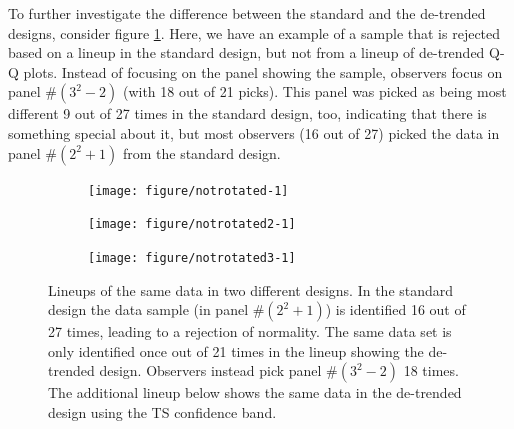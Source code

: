 \documentclass{article}\usepackage[]{graphicx}\usepackage[]{color}
\newenvironment{knitrout}{}{} %
\newcommand{\hh}[1]{{\color{magenta} #1}}
\begin{document}
% 
To further investigate the difference between the standard and the de-trended designs, consider figure \ref{fig:rotstd}. Here, we have an example of a sample that is rejected based on a  lineup in the standard design, but not from a lineup of de-trended Q-Q plots. Instead of focusing on the panel showing the sample, observers focus on panel \#$(3^2-2)$ (with 18 out of 21 picks). This panel was picked as being most different 9 out of 27 times in the standard design, too, indicating that there is something special about it, but most observers (16 out of 27) picked the data in panel \#$(2^2+1)$ from the standard design. 
\begin{figure}[hbt]
\begin{subfigure}{0.5\textwidth}
\begin{knitrout}
\color{fgcolor}
\texttt{[image: figure/notrotated-1]} 

\end{knitrout}
\end{subfigure}
\begin{subfigure}{0.5\textwidth}
\begin{knitrout}
\color{fgcolor}
\texttt{[image: figure/notrotated2-1]} 

\end{knitrout}
\end{subfigure}
\begin{subfigure}{0.5\textwidth}
\begin{knitrout}
\color{fgcolor}
\texttt{[image: figure/notrotated3-1]} 

\end{knitrout}
\end{subfigure}
\caption{\label{fig:rotstd}Lineups of the same data in two different designs. In the standard design the data sample (in panel \#$(2^2+1)$) is identified 16 out of 27 times, leading to a rejection of normality. The same data set is only identified once out of 21 times in the lineup showing the de-trended design. Observers instead pick panel \#$(3^2-2)$ 18 times. \hh{The additional lineup below shows the same data in the de-trended design using the TS confidence band.}}
\end{figure}
\end{document}
